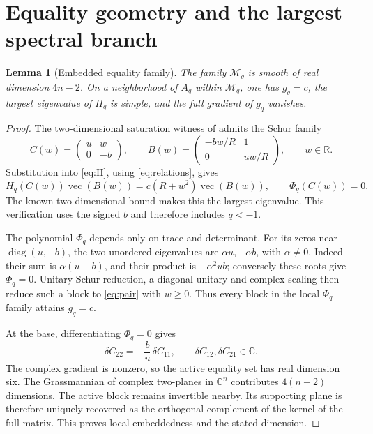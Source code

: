\documentclass[11pt,a4paper]{article}
\newcommand{\diag}{\operatorname{diag}}
\newcommand{\vecop}{\operatorname{vec}}
\newcommand{\Mq}{\mathcal M_q}
\newtheorem{lemma}[theorem]{Lemma}
\begin{document}
\section{Equality geometry and the largest spectral branch}
\begin{lemma}[Embedded equality family]
\label{lem:family}
The family \(\Mq\) is smooth of real dimension \(4n-2\).
On a neighborhood of \(A_q\) within \(\Mq\), one has
\(g_q=c\), the largest eigenvalue of \(H_q\) is simple,
and the full gradient of \(g_q\) vanishes.
\end{lemma}
\begin{proof}
The two-dimensional saturation witness of
\citep{ckos2022response} admits the Schur family
\begin{equation}
 C(w)=\begin{pmatrix}u&w\\0&-b\end{pmatrix},\qquad
 B(w)=\begin{pmatrix}-bw/R&1\\0&uw/R\end{pmatrix},
 \qquad w\in\mathbb R.
 \label{eq:pair}
\end{equation}
Substitution into \eqref{eq:H}, using \eqref{eq:relations}, gives
\begin{equation}
 H_q(C(w))\vecop(B(w))
       =c(R+w^2)\vecop(B(w)),\qquad \Phi_q(C(w))=0.
 \label{eq:paireigen}
\end{equation}
The known two-dimensional bound makes this the largest eigenvalue.
This verification uses the signed \(b\) and therefore includes
\(q<-1\).

The polynomial \(\Phi_q\) depends only on trace and determinant.
For its zeros near \(\diag(u,-b)\), the two unordered eigenvalues
are \(\alpha u,-\alpha b\), with \(\alpha\neq0\).
Indeed their sum is \(\alpha(u-b)\), and their product is
\(-\alpha^2ub\); conversely these roots give \(\Phi_q=0\).
Unitary Schur reduction, a diagonal unitary and complex scaling
then reduce such a block to \eqref{eq:pair} with \(w\geq0\).
Thus every block in the local \(\Phi_q\) family attains \(g_q=c\).

At the base, differentiating \(\Phi_q=0\) gives
\begin{equation}
 \delta C_{22}=-\frac bu\,\delta C_{11},
 \qquad \delta C_{12},\delta C_{21}\in\mathbb C.
 \label{eq:tangent}
\end{equation}
The complex gradient is nonzero, so the active equality set
has real dimension six. The Grassmannian of complex two-planes
in \(\mathbb C^n\) contributes \(4(n-2)\) dimensions.
The active block remains invertible nearby. Its supporting plane
is therefore uniquely recovered as the orthogonal complement of
the kernel of the full matrix. This proves local embeddedness
and the stated dimension.


\end{proof}
\end{document}
